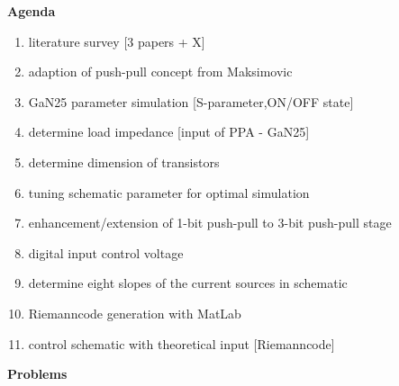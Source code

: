 \textbf{Agenda}
\begin{enumerate}
	\item literature survey [3 papers + X]
	\item adaption of push-pull concept from Maksimovic
	\item GaN25 parameter simulation [S-parameter,ON/OFF state]
	\item determine load impedance [input of PPA - GaN25]
	\item determine dimension of transistors
	\item tuning schematic parameter for optimal simulation
	\item enhancement/extension of 1-bit push-pull to 3-bit push-pull stage
	\item digital input control voltage
	\item determine eight slopes of the current sources in schematic
	\item Riemanncode generation with MatLab
	\item control schematic with theoretical input [Riemanncode]
\end{enumerate}
\vspace{1cm}
\textbf{Problems}
